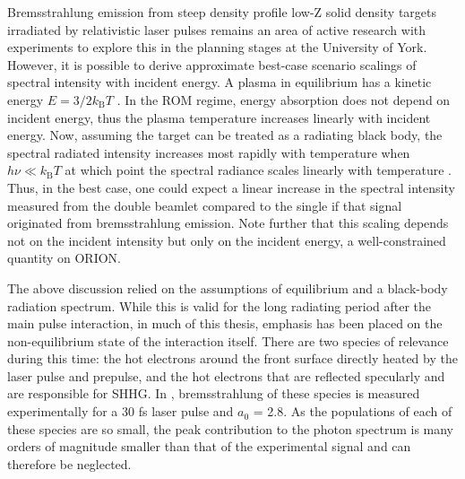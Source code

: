 Bremsstrahlung emission from steep density profile low-Z solid density targets irradiated by relativistic laser pulses remains an area of active research with experiments to explore this in the planning stages at the University of York. However, it is possible to derive approximate best-case scenario scalings of spectral intensity with incident energy. A plasma in equilibrium has a kinetic energy $E = 3/2 k_\mathrm{B}T$ \cite{chenIntroductionPlasmaPhysics2016}. In the ROM regime, energy absorption does not depend on incident energy, thus the plasma temperature increases linearly with incident energy. Now, assuming the target can be treated as a radiating black body, the spectral radiated intensity increases most rapidly with temperature when $h\nu \ll k_\mathrm{B}T$ at which point the spectral radiance scales linearly with temperature \cite{zangwillGuidedConfinedWaves2012}. Thus, in the best case, one could expect a linear increase in the spectral intensity measured from the double beamlet compared to the single if that signal originated from bremsstrahlung emission. Note further that this scaling depends not on the incident intensity but only on the incident energy, a well-constrained quantity on ORION.

The above discussion relied on the assumptions of equilibrium and a black-body radiation spectrum. While this is valid for the long radiating period after the main pulse interaction, in much of this thesis, emphasis has been placed on the non-equilibrium state of the interaction itself. There are two species of relevance during this time: the hot electrons around the front surface directly heated by the laser pulse and prepulse, and the hot electrons that are reflected specularly and are responsible for SHHG. In \cite{zulickHighResolutionBremsstrahlung2013}, bremsstrahlung of these species is measured experimentally for a 30 fs laser pulse and $a_0$ = 2.8. As the populations of each of these species are so small, the peak contribution to the photon spectrum is many orders of magnitude smaller than that of the experimental signal and can therefore be neglected.

